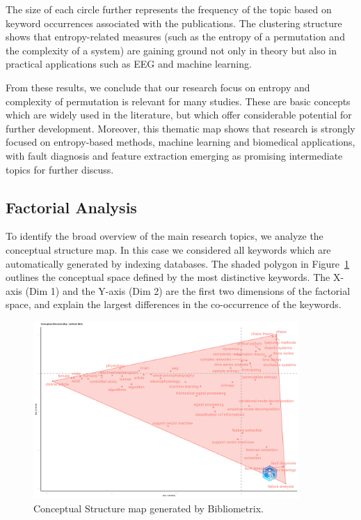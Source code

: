 
The size of each circle further represents the frequency of the topic based on keyword occurrences associated with the publications. The clustering structure shows that entropy-related measures (such as the entropy of a permutation and the complexity of a system) are gaining ground not only in theory but also in practical applications such as EEG and machine learning.

From these results, we conclude that our research focus on entropy and complexity of permutation is relevant for many studies. These are basic concepts which are widely used in the literature, but which offer considerable potential for further development. Moreover, this thematic map shows that research is strongly focused on entropy-based methods, machine learning and biomedical applications, with fault diagnosis and feature extraction emerging as promising intermediate topics for further discuss.


\subsection{Factorial Analysis}
To identify the broad overview of the main research topics, we analyze the conceptual structure map. In this case we considered all keywords which are automatically generated by indexing databases. The shaded polygon in Figure~\ref{fig:factorialMap}  outlines the conceptual space defined by the most distinctive keywords. The X-axis (Dim 1) and the Y-axis (Dim 2) are the first two dimensions of the factorial space, and explain the largest differences in the co-occurrence of the keywords.

\begin{figure}[H]
	\centering
	\includegraphics[width=0.9\textwidth]{FactorialMap}
	\caption{Conceptual Structure map generated by Bibliometrix.}
	\label{fig:factorialMap}
\end{figure}


